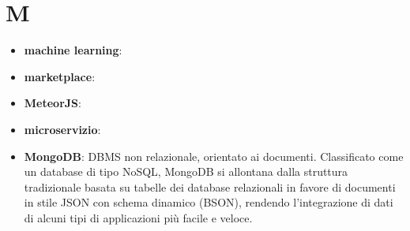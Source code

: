 \section{M}
\begin{itemize} 
	\item \textbf{machine learning}:
	\item \textbf{marketplace}:
	\item \textbf{MeteorJS}:
	\item \textbf{microservizio}:
	\item \textbf{MongoDB}: DBMS non relazionale, orientato ai documenti. Classificato come un database di tipo NoSQL, MongoDB si allontana dalla struttura tradizionale basata su tabelle dei database relazionali in favore di documenti in stile JSON con schema dinamico (BSON), rendendo l'integrazione di dati di alcuni tipi di applicazioni più facile e veloce. 
\end{itemize}
